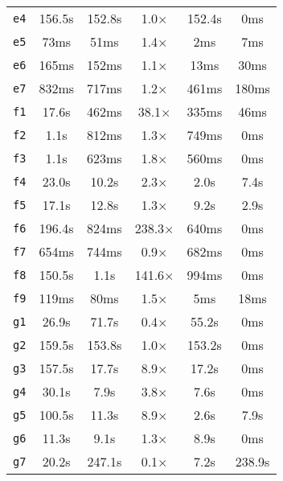 \begin{tabular}{lccccc}
\texttt{e4} & 156.5s & 152.8s & 1.0× & 152.4s & 0ms \\
\texttt{e5} & 73ms & 51ms & 1.4× & 2ms & 7ms \\
\texttt{e6} & 165ms & 152ms & 1.1× & 13ms & 30ms \\
\texttt{e7} & 832ms & 717ms & 1.2× & 461ms & 180ms \\
\texttt{f1} & 17.6s & 462ms & 38.1× & 335ms & 46ms \\
\texttt{f2} & 1.1s & 812ms & 1.3× & 749ms & 0ms \\
\texttt{f3} & 1.1s & 623ms & 1.8× & 560ms & 0ms \\
\texttt{f4} & 23.0s & 10.2s & 2.3× & 2.0s & 7.4s \\
\texttt{f5} & 17.1s & 12.8s & 1.3× & 9.2s & 2.9s \\
\texttt{f6} & 196.4s & 824ms & 238.3× & 640ms & 0ms \\
\texttt{f7} & 654ms & 744ms & 0.9× & 682ms & 0ms \\
\texttt{f8} & 150.5s & 1.1s & 141.6× & 994ms & 0ms \\
\texttt{f9} & 119ms & 80ms & 1.5× & 5ms & 18ms \\
\texttt{g1} & 26.9s & 71.7s & 0.4× & 55.2s & 0ms \\
\texttt{g2} & 159.5s & 153.8s & 1.0× & 153.2s & 0ms \\
\texttt{g3} & 157.5s & 17.7s & 8.9× & 17.2s & 0ms \\
\texttt{g4} & 30.1s & 7.9s & 3.8× & 7.6s & 0ms \\
\texttt{g5} & 100.5s & 11.3s & 8.9× & 2.6s & 7.9s \\
\texttt{g6} & 11.3s & 9.1s & 1.3× & 8.9s & 0ms \\
\texttt{g7} & 20.2s & 247.1s & 0.1× & 7.2s & 238.9s \\
\bottomrule
\end{tabular}
